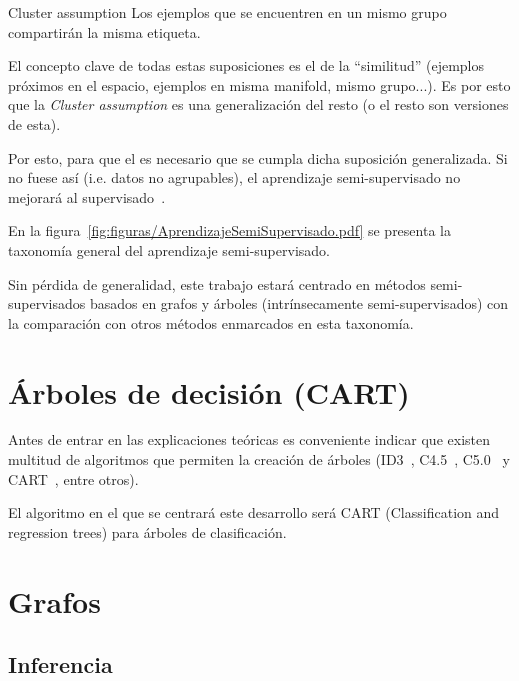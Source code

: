 \medskip

\begin{mainbox}{Cluster assumption}
    Los ejemplos que se encuentren en un mismo grupo compartirán la misma etiqueta.
\end{mainbox}


El concepto clave de todas estas suposiciones es el de la ``similitud'' 
(ejemplos próximos en el espacio, ejemplos en misma manifold, mismo grupo...). 
Es por esto que la \textit{Cluster assumption} es una generalización del
resto (o el resto son versiones de esta).

Por esto, para que el 
es necesario que se cumpla dicha suposición generalizada. Si no fuese así (i.e. datos no agrupables),
el aprendizaje semi-supervisado no mejorará al supervisado~\cite{vanEngelen2020}.


En la figura~\ref{fig:figuras/AprendizajeSemiSupervisado.pdf} se presenta la taxonomía general del aprendizaje semi-supervisado.


Sin pérdida de generalidad, este trabajo estará centrado en métodos semi-supervisados basados en grafos y árboles (intrínsecamente semi-supervisados) con la comparación con otros métodos enmarcados en esta taxonomía.

\clearpage
\section{Árboles de decisión (CART)}

Antes de entrar en las explicaciones teóricas es conveniente indicar que existen multitud de algoritmos que permiten la creación de árboles (ID3~\cite{quinlan1986induction}, C4.5~\cite{quinlan2014c4}, C5.0~\cite{quinlan2004c5} y CART~\cite{breiman2017classification}, entre otros).

El algoritmo en el que se centrará este desarrollo será CART (Classification and regression trees) para árboles de clasificación. 

\section{Grafos}

\subsection{Inferencia}